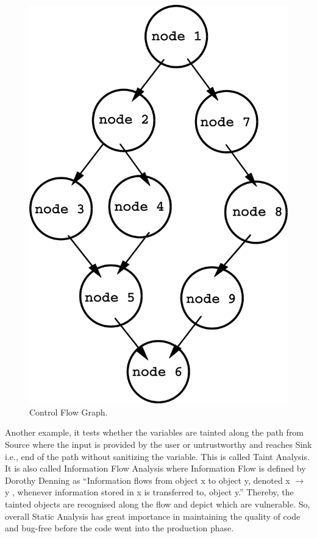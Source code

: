 \begin{figure}[H]
	\centering
	\includegraphics[scale=0.5]{figures/Control_flow_graph}
	\caption{Control Flow Graph.}
	\label{fig:cfg}
\end{figure}

Another example, it tests whether the variables are tainted along the path from Source where the input is provided by the user or untrustworthy and reaches Sink i.e., end of the path without sanitizing the variable. This is called Taint Analysis. It is also called Information Flow Analysis where Information Flow is defined by Dorothy Denning \cite{Denning} as “Information flows from object x to object y, denoted x $\rightarrow$ y , whenever information stored in x is transferred to, object y.” Thereby, the tainted objects are recognised along the flow and depict which are vulnerable. So, overall Static Analysis has great importance in maintaining the quality of code and bug-free before the code went into the production phase. \\ \\


